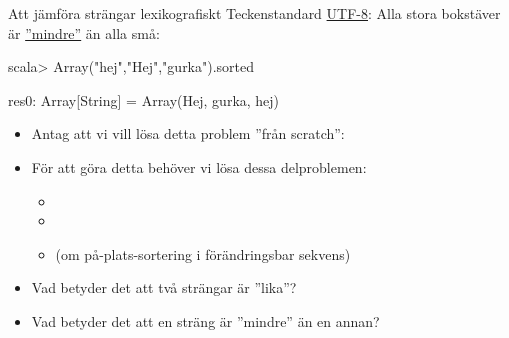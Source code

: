 


\begin{Slide}{Att jämföra strängar lexikografiskt}\SlideFontSmall
Teckenstandard \href{https://sv.wikipedia.org/wiki/UTF-8}{UTF-8}: Alla stora bokstäver är \href{https://www.youtube.com/watch?v=MijmeoH9LT4}{''mindre''} än alla små: 
\begin{REPLnonum}
scala> Array("hej","Hej","gurka").sorted
\end{REPLnonum}
\pause\vspace{-1.2em}
\begin{REPLnonum}
res0: Array[String] = Array(Hej, gurka, hej)\end{REPLnonum}
\pause
\begin{itemize}
\item Antag att vi vill lösa detta problem ''från scratch'': \\ 
\item För att göra detta behöver vi lösa dessa delproblemen:
\begin{itemize}\SlideFontTiny
\item {} 
\item {}
\item {} (om på-plats-sortering i förändringsbar sekvens)
\end{itemize}
\item Vad betyder det att två strängar är ''lika''?

\item Vad betyder det att en sträng är ''mindre'' än en annan?
\end{itemize}

\end{Slide}

